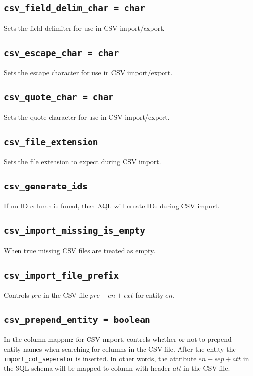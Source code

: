 \documentclass[10pt]{book}
\begin{document}
\subsection{{\tt csv\_field\_delim\_char = char}}
Sets the field delimiter for use in CSV import/export.

\subsection{{\tt csv\_escape\_char = char}}
Sets the escape character for use in CSV import/export.

\subsection{{\tt csv\_quote\_char = char}}
Sets the quote character for use in CSV import/export.

\subsection{{\tt csv\_file\_extension}}
Sets the file extension to expect during CSV import.

\subsection{{\tt csv\_generate\_ids}}
If no ID column is found, then AQL will create IDs during CSV import.

\subsection{{\tt csv\_import\_missing\_is\_empty}}

When true missing CSV files are treated as empty.

\subsection{{\tt csv\_import\_file\_prefix}}

Controls $pre$ in the CSV file $pre + en + ext$ for entity $en$.

\subsection{{\tt csv\_prepend\_entity = boolean}}

In the column mapping for CSV import, controls whether or not to prepend entity names when searching for columns in the CSV file.   After the entity the {\tt import\_col\_seperator} is inserted.  In other words, the attribute $en + sep + att$ in the SQL schema will be mapped to column with header $att$ in the CSV file.
\end{document}
